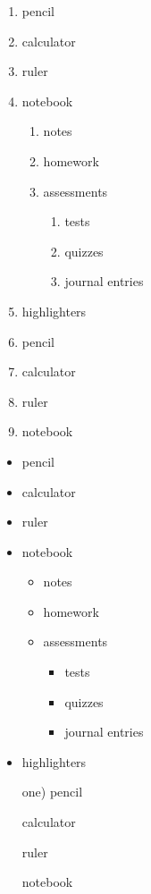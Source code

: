 \documentclass[11pt]{article}
\begin{document}
\begin{enumerate}
\item pencil
\item calculator
\item ruler
\item notebook

	\begin{enumerate}
	\item notes
	\item homework
	\item assessments
		\begin{enumerate}
		\item tests
		\item quizzes
		\item journal entries
		\end{enumerate}
	\end{enumerate}
\item highlighters
\end{enumerate}
\vspace{1cm}
\begin{enumerate}\setcounter{enumi}{5}
\item pencil
\item calculator
\item ruler
\item notebook
\end{enumerate}

\pagebreak
\begin{itemize}
\item pencil
\item calculator
\item ruler
\item notebook

	\begin{itemize}
	\item notes
	\item homework
	\item assessments
		\begin{itemize}
		\item tests
		\item quizzes
		\item journal entries
		\end{itemize}
	\end{itemize}
\item highlighters
\end{itemize}

\vspace{1cm}
\begin{enumerate}
\item[one)] pencil
\item[] calculator
\item[] ruler
\item[] notebook
\end{enumerate}
\end{document}
